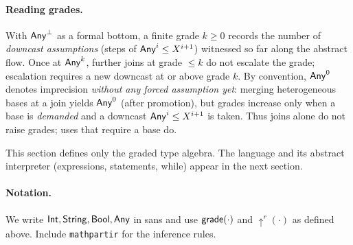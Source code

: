 \paragraph{Reading grades.}
With $\mathsf{Any}^{\bot}$ as a formal bottom, a finite grade $k\ge 0$ records the number of \emph{downcast assumptions} (steps of $\mathsf{Any}^{i}\le X^{i+1}$) witnessed so far along the abstract flow.
Once at $\mathsf{Any}^{k}$, further joins at grade $\le k$ do not escalate the grade; escalation requires a new downcast at or above grade $k$.
By convention, $\mathsf{Any}^{0}$ denotes imprecision \emph{without any forced assumption yet}:
merging heterogeneous bases at a join yields $\mathsf{Any}^{0}$ (after promotion), but grades increase only when a base is \emph{demanded} and a downcast $\mathsf{Any}^{i}\le X^{i+1}$ is taken.
Thus joins alone do not raise grades; uses that require a base do.

\medskip
This section defines only the graded type algebra.
The language and its abstract interpreter (expressions, statements, \textsf{while}) appear in the next section.

\paragraph*{Notation.}
We write $\mathsf{Int},\mathsf{String},\mathsf{Bool},\mathsf{Any}$ in \textsf{sans} and use
$\mathsf{grade}(\cdot)$ and $\uparrow^{r}(\cdot)$ as defined above.
Include \texttt{mathpartir} for the inference rules.
